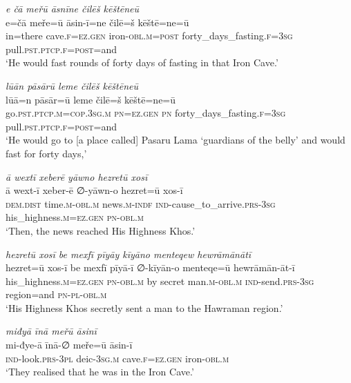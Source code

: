\ea \label{ŽP.121}
\textit{e čā meřū āsnīne čilēš kēštēneū} \\ 
\gll e=čā meře=ū āsin-ī=ne čilē=š kēštē=ne=ū \\ 
 in=there cave\textsc{.f}\textsc{\textsc{=ez.gen}} iron\textsc{-obl}\textsc{.m}\textsc{=\textsc{post}} forty\_days\_fasting\textsc{.f}\textsc{=3sg} pull\textsc{.pst}\textsc{.ptcp}\textsc{.f}\textsc{=\textsc{post}}=and \\ 
\glt `He would fast rounds of forty days of fasting in that Iron Cave.'
\z 
 
\ea \label{ŽP.122}
\textit{lūān pāsārū leme čilēš kēštēneū} \\ 
\gll lūā=n pāsār=ū leme čilē=š kēštē=ne=ū \\ 
 go\textsc{.pst}\textsc{.ptcp}\textsc{.m}\textsc{=cop}\textsc{.3sg}\textsc{.m} \textsc{pn}\textsc{\textsc{=ez.gen}} \textsc{pn} forty\_days\_fasting\textsc{.f}\textsc{=3sg} pull\textsc{.pst}\textsc{.ptcp}\textsc{.f}\textsc{=\textsc{post}}=and \\ 
\glt `He would go to [a place called] Pasaru Lama ‘guardians of the belly’ and would fast for forty days,'
\z 
 
\ea \label{ŽP.124}
\textit{ā wextī xeberē yāwno hezretū xosī} \\ 
\gll ā wext-ī xeber-ē ∅-yāwn-o hezret=ū xos-ī \\ 
 \textsc{dem.dist} time\textsc{.m}\textsc{-obl}\textsc{.m} news\textsc{.m}\textsc{-indf} \textsc{ind-}cause\_to\_arrive\textsc{.prs}\textsc{-3sg} his\_highness\textsc{.m}\textsc{\textsc{=ez.gen}} \textsc{pn}\textsc{-obl}\textsc{.m} \\ 
\glt `Then, the news reached His Highness Khos.'
\z 
 
\ea \label{ŽP.129}
\textit{hezretū xosī be mexfī pīyāy kīyāno menteqew hewrāmānātī} \\ 
\gll hezret=ū xos-ī be mexfī pīyā-ī ∅-kīyān-o menteqe=ū hewrāmān-āt-ī \\ 
 his\_highness\textsc{.m}\textsc{\textsc{=ez.gen}} \textsc{pn}\textsc{-obl}\textsc{.m} by secret man\textsc{.m}\textsc{-obl}\textsc{.m} \textsc{ind-}send\textsc{.prs}\textsc{-3sg} region=and \textsc{pn}\textsc{\textsc{-pl}}\textsc{-obl}\textsc{.m} \\ 
\glt `His Highness Khos secretly sent a man to the Hawraman region.'
\z 
 
\ea \label{ŽP.131}
\textit{miđyā īnā meřū āsinī} \\ 
\gll mi-đye-ā īnā-∅ meře=ū āsin-ī \\ 
 \textsc{ind-}look\textsc{.prs}\textsc{-3pl} deic\textsc{-3sg}\textsc{.m} cave\textsc{.f}\textsc{\textsc{=ez.gen}} iron\textsc{-obl}\textsc{.m} \\ 
\glt `They realised that he was in the Iron Cave.'
\z 
 
